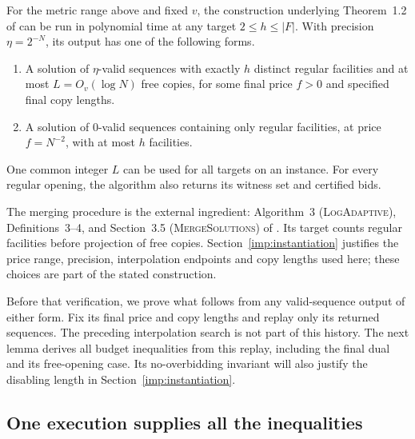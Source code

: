 \begin{theorem}
\label{imp:cglss}
For the metric range above and fixed $v$, the construction underlying
Theorem~1.2 of \cite{CGLSS2026} can be run in polynomial time at any
target $2\le h\le |F|$.  With precision $\eta=2^{-N}$, its output has
one of the following forms.
\begin{enumerate}[label=(\roman*)]
\item A solution of $\eta$-valid sequences with exactly $h$ distinct
regular facilities and at most $L=O_v(\log N)$ free copies, for some
final price $f>0$ and specified final copy lengths.
\item A solution of $0$-valid sequences containing only regular
facilities, at price $f=N^{-2}$, with at most $h$ facilities.
\end{enumerate}
One common integer $L$ can be used for all targets on an instance.
For every regular opening, the algorithm also returns its witness set
and certified bids.
\end{theorem}

The merging procedure is the external ingredient: Algorithm~3
(\textsc{LogAdaptive}), Definitions~3--4, and Section~3.5
(\textsc{MergeSolutions}) of \cite{CGLSS2026}. Its target counts
regular facilities before projection of free copies. Section~\ref{imp:instantiation}
justifies the price range, precision, interpolation endpoints and copy
lengths used here; these choices are part of the stated construction.

Before that verification, we prove what follows from any valid-sequence
output of either form. Fix its final price and copy lengths and replay
only its returned sequences. The preceding interpolation search is not
part of this history. The next lemma derives all budget inequalities
from this replay, including the final dual and its free-opening case.
Its no-overbidding invariant will also justify the disabling length
in Section~\ref{imp:instantiation}.

\subsection{One execution supplies all the inequalities}

